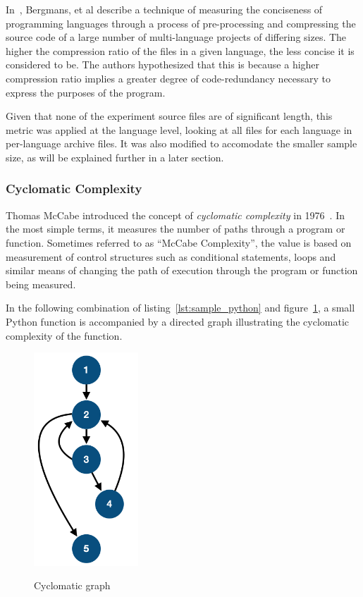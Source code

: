 In~\cite{bergmans}, Bergmans, et al describe a technique of measuring the conciseness of programming languages through a process of pre-processing and compressing the source code of a large number of multi-language projects of differing sizes. The higher the compression ratio of the files in a given language, the less concise it is considered to be. The authors hypothesized that this is because a higher compression ratio implies a greater degree of code-redundancy necessary to express the purposes of the program.

Given that none of the experiment source files are of significant length, this metric was applied at the language level, looking at all files for each language in per-language archive files. It was also modified to accomodate the smaller sample size, as will be explained further in a later section.

\subsubsection{Cyclomatic Complexity}

Thomas McCabe introduced the concept of \textit{cyclomatic complexity} in 1976~\cite{mccabe}. In the most simple terms, it measures the number of paths through a program or function. Sometimes referred to as ``McCabe Complexity'', the value is based on measurement of control structures such as conditional statements, loops and similar means of changing the path of execution through the program or function being measured.

In the following combination of listing~\ref{lst:sample_python} and figure~\ref{fig:image:mccabe}, a small Python function is accompanied by a directed graph illustrating the cyclomatic complexity of the function.

\begin{figure}[ht]
    \centering
    \begin{minipage}[t]{.45\textwidth}
        
    \end{minipage}\hfill
    \begin{minipage}[t]{.45\textwidth}
        \caption{Cyclomatic graph}
        \centering
        \includegraphics[width=0.35\textwidth]{figures/mccabe.png}
        \label{fig:image:mccabe}
    \end{minipage}
\end{figure}

